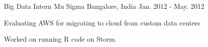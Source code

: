 \begin{cventries}
  \cventry
    {Big Data Intern} %
    {Mu Sigma} %
    {Bangalore, India} %
    {Jan. 2012 - May. 2012} %
    {
      \begin{cvitems} %
        \item {Evaluating AWS for migrating to cloud from custom data centers}
        \item {Worked on running R code on Storm.}
      \end{cvitems}
    }

\end{cventries}
